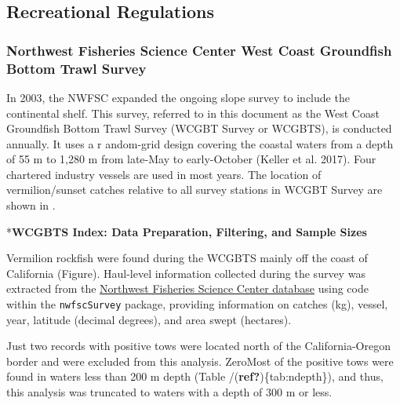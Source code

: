 \documentclass[11pt,
  english,
  a4paper,
]{article}
\begin{document}
\clearpage


\hypertarget{regs-graphic}{%
\subsection{Recreational Regulations}\label{regs-graphic}}

\leavevmode\tagmcend\tagstructend


\hypertarget{northwest-fisheries-science-center-west-coast-groundfish-bottom-trawl-survey-1}{%
\subsubsection{Northwest Fisheries Science Center West Coast Groundfish Bottom Trawl Survey}\label{northwest-fisheries-science-center-west-coast-groundfish-bottom-trawl-survey-1}}

\leavevmode\tagmcend\tagstructend

In 2003, the NWFSC expanded the ongoing slope survey to include the continental shelf. This survey, referred to in this document as the West Coast Groundfish Bottom Trawl Survey (WCGBT Survey or WCGBTS), is conducted annually. It uses a r andom-grid design covering the coastal waters from a depth of 55 m to 1,280 m from late-May to early-October {(Keller et al. 2017)\leavevmode\tagmcend\tagstructend}. Four chartered industry vessels are used in most years. The location of vermilion/sunset catches relative to all survey stations in WCGBT Survey are shown in .

*\textbf{WCGBTS Index: Data Preparation, Filtering, and Sample Sizes}

Vermilion rockfish were found during the WCGBTS mainly off the coast of California (Figure). Haul-level information collected during the survey was extracted from the {\href{https://www.webapps.nwfsc.noaa.gov/data}{Northwest Fisheries Science Center database}\leavevmode\tagmcend\tagstructend} using code within the \texttt{nwfscSurvey} package, providing information on catches (kg), vessel, year, latitude (decimal degrees), and area swept (hectares).

Just two records with positive tows were located north of the California-Oregon border and were excluded from this analysis. ZeroMost of the positive tows were found in waters less than 200 m depth (Table /{(\textbf{ref?})\leavevmode\tagmcend\tagstructend}\{tab:ndepth\}), and thus, this analysis was truncated to waters with a depth of 300 m or less.
\end{document}
